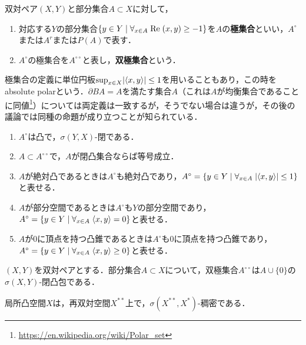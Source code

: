 \documentclass[uplatex,dvipdfmx]{jsreport}
\begin{document}
\begin{definition}\label{def-polar}
    双対ペア$(X,Y)$と部分集合$A\subset X$に対して，
    \begin{enumerate}
        \item 対応する$Y$の部分集合$\left\{y\in Y\mid \forall_{x\in A}\;\mathrm{Re}\;(x,y)\ge-1\right\}$を$A$の\textbf{極集合}といい，$A^\circ$または$A^r$または$P(A)$で表す．
        \item $A^\circ$の極集合を$A^{\circ\circ}$と表し，\textbf{双極集合}という．
    \end{enumerate}
\end{definition}
\begin{remark}
    極集合の定義に単位円板$\sup_{x\in X}\lvert\langle x,y\rangle\rvert\le1$を用いることもあり，この時をabsolute polarという．$\partial BA=A$を満たす集合$A$（これは$A$が均衡集合であることに同値\footnote{\url{https://en.wikipedia.org/wiki/Polar_set}}）については両定義は一致するが，そうでない場合は違うが，その後の議論では同種の命題が成り立つことが知られている．
\end{remark}

\begin{lemma}[極集合の性質]\mbox{}\label{lemma-polar}
    \begin{enumerate}
        \item $A^\circ$は凸で，$\sigma(Y,X)$-閉である．
        \item $A\subset A^{\circ\circ}$で，$A$が閉凸集合ならば等号成立．
        \item $A$が絶対凸であるときは$A^\circ$も絶対凸であり，$A^\circ=\left\{y\in Y\mid\forall_{x\in A}\;\lvert\langle x,y\rangle\rvert\le 1\right\}$と表せる．
        \item $A$が部分空間であるときは$A^\circ$も$Y$の部分空間であり，$A^\circ=\left\{y\in Y\mid\forall_{x\in A}\;\langle x,y\rangle=0\right\}$と表せる．
        \item $A$が$0$に頂点を持つ凸錐であるときは$A^\circ$も$0$に頂点を持つ凸錐であり，$A^\circ=\left\{y\in Y\mid\forall_{x\in A}\;\langle x,y\rangle\ge0\right\}$と表せる．
    \end{enumerate}
\end{lemma}

\begin{theorem}[双極定理]\label{thm-polar-theorem}
    $(X,Y)$を双対ペアとする．部分集合$A\subset X$について，双極集合$A^{\circ\circ}$は$A\cup\{0\}$の$\sigma(X,Y)$-閉凸包である．
\end{theorem}

\begin{corollary}
    局所凸空間$X$は，再双対空間$X^{**}$上で，$\sigma(X^{**},X^*)$-稠密である．
\end{corollary}
\end{document}
